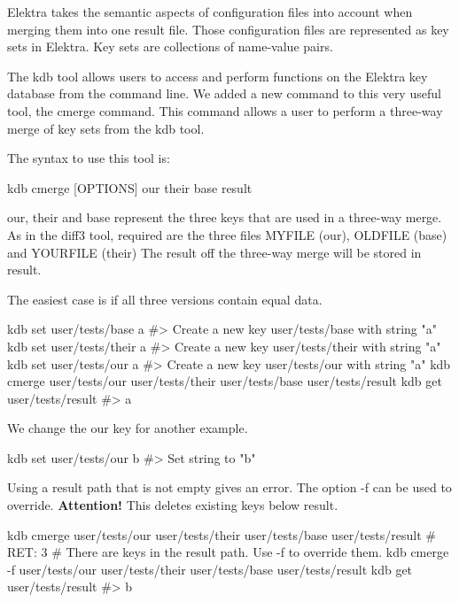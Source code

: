 Elektra takes the semantic aspects of configuration files into account when merging them into one result file. Those configuration files are represented as key sets in Elektra. Key sets are collections of name-\/value pairs.

The {\ttfamily kdb} tool allows users to access and perform functions on the Elektra key database from the command line. We added a new command to this very useful tool, the {\ttfamily cmerge} command. This command allows a user to perform a three-\/way merge of key sets from the {\ttfamily kdb} tool.

The syntax to use this tool is\+:

{\ttfamily kdb cmerge \mbox{[}O\+P\+T\+I\+O\+NS\mbox{]} our their base result}

{\ttfamily our}, {\ttfamily their} and {\ttfamily base} represent the three keys that are used in a three-\/way merge. As in the {\ttfamily diff3} tool, required are the three files M\+Y\+F\+I\+LE (our), O\+L\+D\+F\+I\+LE (base) and Y\+O\+U\+R\+F\+I\+LE (their) The result off the three-\/way merge will be stored in {\ttfamily result}.

The easiest case is if all three versions contain equal data.


\begin{DoxyCode}
kdb set user/tests/base a
#> Create a new key user/tests/base with string "a"
kdb set user/tests/their a
#> Create a new key user/tests/their with string "a"
kdb set user/tests/our a
#> Create a new key user/tests/our with string "a"
kdb cmerge user/tests/our user/tests/their user/tests/base user/tests/result
kdb get user/tests/result
#> a
\end{DoxyCode}


We change the our key for another example.


\begin{DoxyCode}
kdb set user/tests/our b
#> Set string to "b"
\end{DoxyCode}


Using a {\ttfamily result} path that is not empty gives an error. The option {\ttfamily -\/f} can be used to override. {\bfseries Attention!} This deletes existing keys below {\ttfamily result}.


\begin{DoxyCode}
kdb cmerge user/tests/our user/tests/their user/tests/base user/tests/result
# RET: 3
# There are keys in the result path. Use -f to override them.
kdb cmerge -f user/tests/our user/tests/their user/tests/base user/tests/result
kdb get user/tests/result
#> b
\end{DoxyCode}


